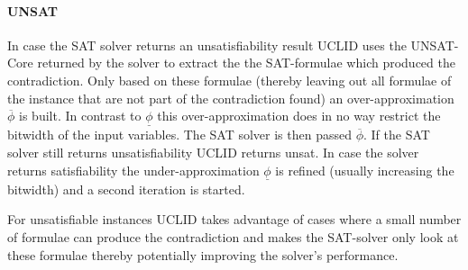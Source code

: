 \paragraph{UNSAT} In case the SAT solver returns an unsatisfiability result \textsc{UCLID} uses the UNSAT-Core returned by the solver to extract the the SAT-formulae which produced the contradiction. Only based on these formulae (thereby leaving out all formulae of the instance that are not part of the contradiction found) an over-approximation $\overline{\phi}$ is built. In contrast to $\underline{\phi}$ this over-approximation does in no way restrict the bitwidth of the input variables. The SAT solver is then passed $\overline{\phi}$. If the SAT solver still returns unsatisfiability \textsc{UCLID} returns unsat. In case the solver returns satisfiability the under-approximation $\underline{\phi}$ is refined (usually increasing the bitwidth) and a second iteration is started.
\par
For unsatisfiable instances \textsc{UCLID} takes advantage of cases where a small number of formulae can produce the contradiction and makes the SAT-solver only look at these formulae thereby potentially improving the solver's performance.
